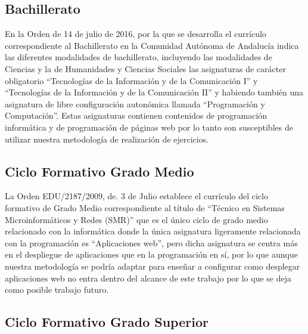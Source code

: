 \subsection {Bachillerato}

En la Orden de 14 de julio de 2016, por la que se desarrolla el currículo correspondiente al Bachillerato en la Comunidad Autónoma de Andalucía indica las diferentes modalidades de bachillerato, incluyendo las modalidades de Ciencias y la de Humanidades y Ciencias Sociales las asignaturas de carácter obligatorio ``Tecnologías de la Información y de la Comunicación I'' y ``Tecnologías de la Información y de la Comunicación II'' y habiendo también una asignatura de libre configuración autonómica llamada ``Programación y Computación''. Estas asignaturas contienen contenidos de programación informática y de programación de páginas web por lo tanto son susceptibles de utilizar nuestra metodología de realización de ejercicios.

\subsection {Ciclo Formativo Grado Medio}

La Orden EDU/2187/2009, de. 3 de Julio establece el currículo del ciclo formativo de Grado Medio correspondiente al título de ``Técnico en Sistemas Microinformáticos y Redes (SMR)'' que es el único ciclo de grado medio relacionado con la informática donde la única asignatura ligeramente relacionada con la programación es ``Aplicaciones web'', pero dicha asignatura se centra más en el despliegue de aplicaciones que en la programación en sí, por lo que aunque nuestra metodología se podría adaptar para enseñar a configurar como desplegar aplicaciones web no entra dentro del alcance de este trabajo por lo que se deja como posible trabajo futuro.

\subsection {Ciclo Formativo Grado Superior}

